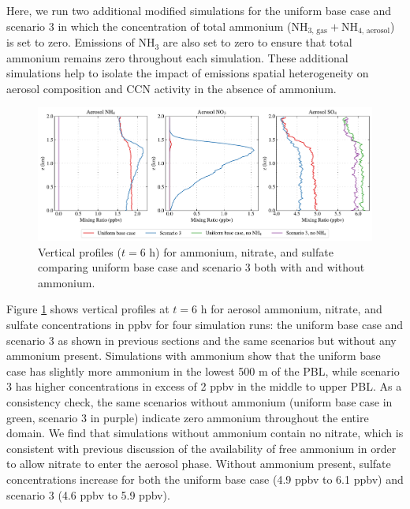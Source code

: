 Here, we run two additional modified simulations for the uniform base case and scenario 3 in which the concentration of total ammonium ($\text{NH}_{3\text{, gas}} + \text{NH}_{4\text{, aerosol}}$) is set to zero. Emissions of NH$_3$ are also set to zero to ensure that total ammonium remains zero throughout each simulation. These additional simulations help to isolate the impact of emissions spatial heterogeneity on aerosol composition and CCN activity in the absence of ammonium.  

\begin{figure}[!t]
  \centering
    \includegraphics[width=\textwidth]{figures/chapter5/aerosol-SNA-vertical-profiles-no-nh4-cases-time36.pdf}
    \caption{Vertical profiles ($t=6$ h) for ammonium, nitrate, and sulfate comparing uniform base case and scenario 3 both with and without ammonium.}
    \label{fig:vert-profiles-no-nh4}
\end{figure}

Figure \ref{fig:vert-profiles-no-nh4} shows vertical profiles at $t=6$ h for aerosol ammonium, nitrate, and sulfate concentrations in ppbv for four simulation runs: the uniform base case and scenario 3 as shown in previous sections and the same scenarios but without any ammonium present. Simulations with ammonium show that the uniform base case has slightly more ammonium in the lowest 500 m of the PBL, while scenario 3 has higher concentrations in excess of 2 ppbv in the middle to upper PBL. As a consistency check, the same scenarios without ammonium (uniform base case in green, scenario 3 in purple) indicate zero ammonium throughout the entire domain. We find that simulations without ammonium contain no nitrate, which is consistent with previous discussion of the availability of free ammonium in order to allow nitrate to enter the aerosol phase. Without ammonium present, sulfate concentrations increase for both the uniform base case (4.9 ppbv to 6.1 ppbv) and scenario 3 (4.6 ppbv to 5.9 ppbv).

